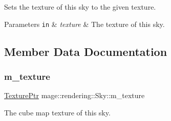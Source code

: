 Sets the texture of this sky to the given texture.


\begin{DoxyParams}[1]{Parameters}
\mbox{\tt in}  & {\em texture} & The texture of this sky. \\
\hline
\end{DoxyParams}


\subsection{Member Data Documentation}
\hypertarget{classmage_1_1rendering_1_1_sky_a674493833d7c13a329ba35429a1d9dfa}{}\label{classmage_1_1rendering_1_1_sky_a674493833d7c13a329ba35429a1d9dfa} 
\subsubsection{\texorpdfstring{m\+\_\+texture}{m\_texture}}
{\footnotesize\ttfamily \hyperlink{namespacemage_1_1rendering_a6f3ae54f825328465b0cdde0f0de4a36}{Texture\+Ptr} mage\+::rendering\+::\+Sky\+::m\+\_\+texture\hspace{0.3cm}{\ttfamily [private]}}

The cube map texture of this sky. 
